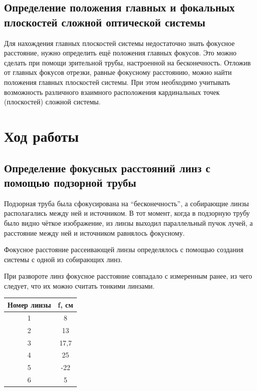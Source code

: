 \documentclass[12pt,a4paper]{article}
\begin{document}
\subsection*{Определение положения главных и фокальных плоскостей сложной оптической системы}

Для нахождения главных плоскостей системы недостаточно знать фокусное расстояние, нужно определить ещё положения главных фокусов. Это можно сделать при помощи зрительной трубы, настроенной на бесконечность. Отложив от главных фокусов отрезки, равные фокусному расстоянию, можно найти положения главных плоскостей системы. При этом необходимо учитывать возможность различного взаимного расположения кардинальных точек (плоскостей) сложной системы.






\section*{Ход работы}

\subsection*{Определение фокусных расстояний линз с помощью подзорной трубы}

Подзорная труба была сфокусирована на ``бесконечность'', а собирающие линзы располагались между ней и источником. В тот момент, когда в подзорную трубу было видно чёткое изображение, из линзы выходил параллельный пучок лучей, а расстояние между ней и источником равнялось фокусному.

Фокусное расстояние рассеивающей линзы определялось с помощью создания системы с одной из собирающих линз.

При развороте линз фокусное расстояние совпадало с измеренным ранее, из чего следует, что их можно считать тонкими линзами.


\begin{table}[H]
\begin{tabular}{|c|c|}
\hline
Номер линзы & f, см \\ \hline
1           & 8     \\ \hline
2           & 13    \\ \hline
3           & 17,7  \\ \hline
4           & 25    \\ \hline
5           & -22   \\ \hline
6           & 5     \\ \hline
\end{tabular}
\end{table}
\end{document}
